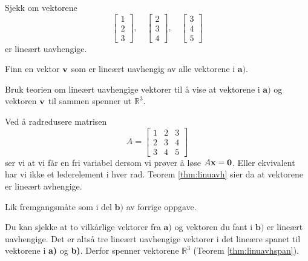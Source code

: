 \begin{oppgave}
\begin{punkt}
Sjekk om vektorene $$
\begin{bmatrix}
1\\
2\\
3
\end{bmatrix}, \quad \begin{bmatrix}
2\\
3\\
4
\end{bmatrix}, \quad \begin{bmatrix}
3\\
4\\
5
\end{bmatrix}
$$
er lineært uavhengige.
\end{punkt}

\begin{punkt}
Finn en vektor $\mathbf{v}$ som er lineært uavhengig av alle vektorene i $\textbf{a)}$.
\end{punkt}

\begin{punkt}
Bruk teorien om lineært uavhengige vektorer til å vise at vektorene i $\textbf{a)}$ og vektoren $\mathbf{v}$ til sammen spenner ut $\mathbb{R}^3$.
\end{punkt}
\end{oppgave}

\begin{losning}

\begin{punkt}
Ved å radredusere matrisen $$A=\begin{bmatrix}
1 & 2 & 3\\
2 & 3 & 4\\
3 & 4 & 5
\end{bmatrix}$$ ser vi at vi får en fri variabel dersom vi prøver å løse $A\mathbf{x}=\mathbf{0}$. Eller ekvivalent har vi ikke et lederelement i hver rad. Teorem \ref{thm:linuavh} sier da at vektorene er lineært avhengige.
\end{punkt}

\begin{punkt}
Lik fremgangsmåte som i del $\textbf{b)}$ av forrige oppgave.
\end{punkt}


\begin{punkt}
Du kan sjekke at to vilkårlige vektorer fra $\textbf{a)}$ og vektoren du fant i $\textbf{b)}$ er lineært uavhengige. Det er altså tre lineært uavhengige vektorer i det lineære spanet til vektorene i \textbf{a)} og \textbf{b)}. Derfor spenner vektorene $\mathbb{R}^3$ (Teorem \ref{thm:linuavhspan}).
\end{punkt}

\end{losning}









